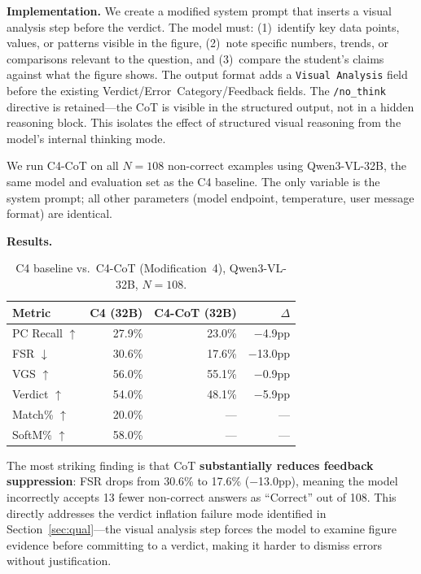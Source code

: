 \documentclass{article}
\begin{document}
\textbf{Implementation.} We create a modified system prompt that inserts a visual analysis step
before the verdict. The model must: (1)~identify key data points, values, or patterns
visible in the figure, (2)~note specific numbers, trends, or comparisons relevant to
the question, and (3)~compare the student's claims against what the figure shows. The
output format adds a \texttt{Visual Analysis} field before the existing
Verdict/Error~Category/Feedback fields. The \texttt{/no\_think} directive is
retained---the CoT is visible in the structured output, not in a hidden reasoning
block. This isolates the effect of structured visual reasoning from the model's
internal thinking mode.

We run C4-CoT on all $N{=}108$ non-correct examples using Qwen3-VL-32B, the same
model and evaluation set as the C4 baseline. The only variable is the system prompt;
all other parameters (model endpoint, temperature, user message format) are identical.

\textbf{Results.}

\begin{table}[h]
\centering
\small
\begin{tabular}{@{}lrrr@{}}
\toprule
Metric & C4 (32B) & C4-CoT (32B) & $\Delta$ \\
\midrule
PC Recall $\uparrow$ & 27.9\% & 23.0\% & $-$4.9pp \\
FSR $\downarrow$      & 30.6\% & 17.6\% & $-$13.0pp \\
VGS $\uparrow$        & 56.0\% & 55.1\% & $-$0.9pp \\
Verdict $\uparrow$    & 54.0\% & 48.1\% & $-$5.9pp \\
Match\% $\uparrow$    & 20.0\% & --- & --- \\
SoftM\% $\uparrow$    & 58.0\% & --- & --- \\
\bottomrule
\end{tabular}
\caption{C4 baseline vs.\ C4-CoT (Modification~4), Qwen3-VL-32B, $N{=}108$.}
\label{tab:cot_comparison}
\end{table}

The most striking finding is that CoT \textbf{substantially reduces feedback
suppression}: FSR drops from 30.6\% to 17.6\% ($-$13.0pp), meaning the model
incorrectly accepts 13 fewer non-correct answers as ``Correct'' out of 108. This
directly addresses the verdict inflation failure mode identified in
Section~\ref{sec:qual}---the visual analysis step forces the model to examine figure
evidence before committing to a verdict, making it harder to dismiss errors without
justification.
\end{document}

